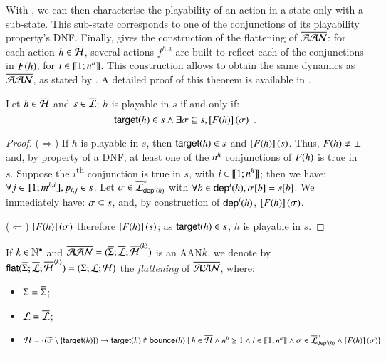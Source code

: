 With , we can then characterise the playability of an action in a state only with a sub-state.
This sub-state corresponds to one of the conjunctions of its playability property's DNF.
Finally,  gives the construction of the flattening of $\overline{\mathcal{AAN}}$:
for each action $h \in \overline{\mathcal{H}}$, several actions $f^{h,i}$ are built to reflect each of the conjunctions in $F(h)$,
\ie for $i \in \llbracket 1; n^{h} \rrbracket$.
This construction allows to obtain the same dynamics as $\overline{\mathcal{AAN}}$, as stated by .
A detailed proof of this theorem is available in .
%
\begin{lemma}
\label{lem:ppplaysubset}
  Let $h \in \overline{\mathcal{H}}$ and $s \in \overline{\mathcal{L}}$;
  $h$ is playable in $s$ if and only if:
  \[\mathsf{target}(h) \in s \wedge \exists \sigma \subseteq s, \left[F(h)\right](\sigma) \enspace.\]
\end{lemma}
%
\begin{proof}
  ($\Rightarrow$)
    If $h$ is playable in $s$, then $\mathsf{target}(h) \in s$ and $\left[F(h)\right](s)$.
    Thus, $F(h) \not\equiv \bot$ and, by property of a DNF,
    at least one of the $n^{h}$ conjunctions of $F(h)$ is true in $s$.
    Suppose the $i$\textsuperscript{th} conjunction is true in $s$, with $i \in \llbracket 1; n^{h} \rrbracket$;
    then we have: $\forall j \in \llbracket 1; m^{h,i} \rrbracket, p_{i,j} \in s$.
    Let $\sigma \in \overline{\mathcal{L}}^{\diamond}_{\mathsf{dep}^{i}(h)}$
    with $\forall b \in \mathsf{dep}^{i}(h), {\sigma[b]} = {s[b]}$.
    We immediately have: $\sigma \subseteq s$,
    and, by construction of $\mathsf{dep}^{i}(h)$, $\left[F(h)\right](\sigma)$.
  
  ($\Leftarrow$)
    $\left[F(h)\right](\sigma)$ therefore $\left[F(h)\right](s)$; as $\mathsf{target}(h) \in s$,
    $h$ is playable in $s$.
\end{proof}

\begin{definition}
  \label{def:flattening}
  If $k \in \mathbb{N}^\bullet$ and $\overline{\mathcal{AAN}} = (\overline{\Sigma}; \overline{\mathcal{L}}; \overline{\mathcal{H}}^{{\langle k \rangle}})$ is an AAN$k$,
  we denote by
  $\mathsf{flat}(\overline{\Sigma}; \overline{\mathcal{L}}; \overline{\mathcal{H}}^{{\langle k \rangle}}) = (\Sigma; \mathcal{L}; \mathcal{H})$
  the \emph{flattening} of $\overline{\mathcal{AAN}}$, where:
  \begin{itemize}
    \item $\Sigma = \overline{\Sigma}$;
    
    \item $\mathcal{L} = \overline{\mathcal{L}}$;
    
    \item $\mathcal{H} = \{
      (\widetilde{\sigma} \setminus \{ \mathsf{target}(h) \})\rightarrow\mathsf{target}(h)\Rsh\mathsf{bounce}(h) \mid
      h \in \overline{\mathcal{H}} \wedge n^{h} \geq 1 \wedge i \in \llbracket 1; n^{h} \rrbracket \wedge
      \sigma \in \overline{\mathcal{L}}^{\diamond}_{\mathsf{dep}^{i}(h)} \wedge
      \left[F(h)\right](\sigma) \}$.
  \end{itemize}
\end{definition}

